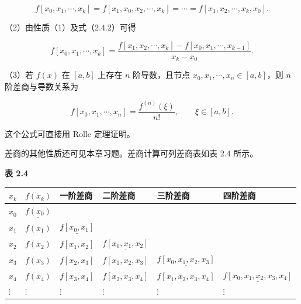 \[
f[x_0,x_1,\cdots,x_k]=f[x_1,x_0,x_2,\cdots,x_k]=\cdots=f[x_1,x_2,\cdots,x_k,x_0].
\]

（2）由性质（1）及式（2.4.2）可得

\[
f[x_0,x_1,\cdots,x_k]=\frac{f[x_1,x_2,\cdots,x_k]-f[x_0,x_1,\cdots,x_{k-1}]}{x_k-x_0}.
\tag{2.4.4}
\]

（3）若 \(f(x)\) 在 \([a,b]\) 上存在 \(n\) 阶导数，且节点 \(x_0,x_1,\cdots,x_n\in[a,b]\)，则 \(n\) 阶差商与导数关系为

\[
f[x_0,x_1,\cdots,x_n]=\frac{f^{(n)}(\xi)}{n!},\qquad\xi\in[a,b].
\tag{2.4.5}
\]

这个公式可直接用 Rolle 定理证明。

差商的其他性质还可见本章习题。差商计算可列差商表如表 2.4 所示。

\textbf{表 2.4}

{\def\LTcaptype{none} %
\begin{longtable}[]{@{}
  >{\raggedright\arraybackslash}p{}
  >{\raggedright\arraybackslash}p{}
  >{\raggedright\arraybackslash}p{}
  >{\raggedright\arraybackslash}p{}
  >{\raggedright\arraybackslash}p{}
  >{\raggedright\arraybackslash}p{}@{}}
\toprule\noalign{}
\begin{minipage}[b]{\linewidth}\raggedright
\(x_k\)
\end{minipage} & \begin{minipage}[b]{\linewidth}\raggedright
\(f(x_k)\)
\end{minipage} & \begin{minipage}[b]{\linewidth}\raggedright
一阶差商
\end{minipage} & \begin{minipage}[b]{\linewidth}\raggedright
二阶差商
\end{minipage} & \begin{minipage}[b]{\linewidth}\raggedright
三阶差商
\end{minipage} & \begin{minipage}[b]{\linewidth}\raggedright
四阶差商
\end{minipage} \\
\midrule\noalign{}
\endhead
\bottomrule\noalign{}
\endlastfoot
\(x_0\) & \(\underline{f(x_0)}\) & & & & \\
\(x_1\) & \(f(x_1)\) & \(\underline{f[x_0,x_1]}\) & & & \\
\(x_2\) & \(f(x_2)\) & \(f[x_1,x_2]\) & \(\underline{f[x_0,x_1,x_2]}\) & & \\
\(x_3\) & \(f(x_3)\) & \(f[x_2,x_3]\) & \(f[x_1,x_2,x_3]\) & \(\underline{f[x_0,x_1,x_2,x_3]}\) & \\
\(x_4\) & \(f(x_4)\) & \(f[x_3,x_4]\) & \(f[x_2,x_3,x_4]\) & \(f[x_1,x_2,x_3,x_4]\) & \(\underline{f[x_0,x_1,x_2,x_3,x_4]}\) \\
\(\vdots\) & \(\vdots\) & \(\vdots\) & \(\vdots\) & \(\vdots\) & \(\vdots\) \\
\end{longtable}
}

